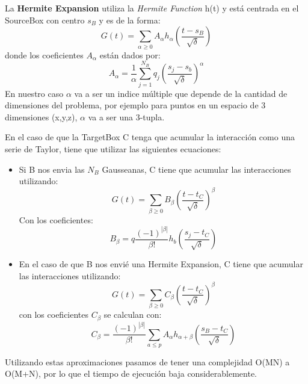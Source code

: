 \documentclass[letter, 10pt]{article}
\begin{document}
La \textbf{Hermite Expansion} utiliza la \textit{Hermite Function} h(t) y está centrada en el SourceBox con centro $s_B$ y es de la forma:
\begin{equation}
    G(t) = \sum_{\alpha \geq 0} A_\alpha h_\alpha\left( \frac{t- s_B}{\sqrt{\delta}}\right)
\end{equation}
donde los coeficientes $A_\alpha$ están dados por:
\begin{equation}
 A_\alpha = \frac{1}{\alpha} \sum_{j=1}^{N_B} q_j \left(\frac{s_j - s_b}{\sqrt{\delta}}\right)^\alpha
\end{equation}
En nuestro caso $\alpha$ va a ser un indice múltiple que depende de la cantidad de dimensiones del problema, por ejemplo para puntos en un espacio de 3 dimensiones (x,y,z), $\alpha$ va a ser una 3-tupla.

En el caso de que la TargetBox C tenga que acumular la interacción como una serie de Taylor, tiene que utilizar las siguientes ecuaciones:
\begin{itemize}
\item Si B nos envia las $N_B$ Gausseanas, C tiene que acumular las interacciones utilizando:
\begin{equation}
 G(t) = \sum_{\beta \geq 0} B_\beta \left( \frac{t-t_C}{\sqrt{\delta}} \right) ^\beta
\end{equation}
Con los coeficientes:
\begin{equation}
B_\beta = q \frac{(-1)^|\beta|}{\beta!}h_b\left(\frac{s_j - t_C}{\sqrt{\delta}}\right)
\end{equation}

\item En el caso de que B nos envié una Hermite Expansion, C tiene que acumular las interacciones utilizando:
\begin{equation}
G(t) = \sum_{\beta \geq 0} C_\beta \left(\frac{t-t_C}{\sqrt{\delta}}\right)^\beta
\end{equation}
con los coeficientes $C_\beta$ se calculan con:
\begin{equation}
C_\beta = \frac{(-1)^{|\beta|}}{\beta!} \sum_{a\leq p} A_\alpha h_{\alpha + \beta} \left( \frac{s_B - t_C}{\sqrt{\delta}} \right)
\end{equation}
\end{itemize}


Utilizando estas aproximaciones pasamos de tener una complejidad O(MN) a O(M+N), por lo que el tiempo de ejecución baja considerablemente.
\end{document}
